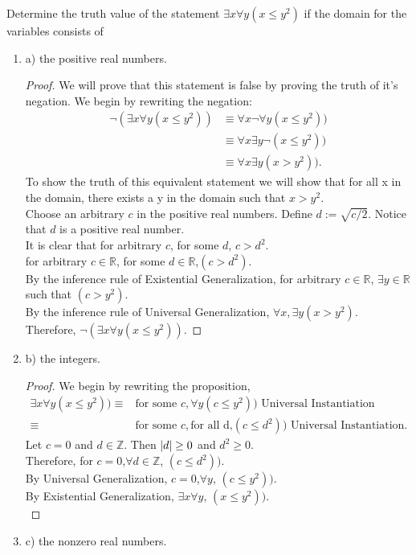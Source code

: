 \begin{exmp}
Determine the truth value of the statement $\exists x \forall y (x\leq y^2)$
if the domain for the variables consists of
\newline
\begin{enumerate}
\item a) the positive real numbers.
\vspace{3cm}
\begin{proof}
We will prove that this statement is false by proving the truth of it's negation.
We begin by rewriting the negation:
\begin{align}
\lnot(\exists x \forall y (x\leq y^2))&\equiv \forall x \lnot \forall y (x\leq y^2))\\
&\equiv \forall x  \exists y \lnot  (x\leq y^2))\\
&\equiv \forall x  \exists y (x > y^2)).
\end{align}
To show the truth of this equivalent statement we will show that for all x in the domain, there exists a y in the domain such that $x>y^2$.
\\
Choose an arbitrary $c$ in the positive real numbers. Define $d:=\sqrt{c/2}$. Notice that $d$ is a positive real number.
\\
It is clear that for arbitrary $c$, for some $d$, $c>d^2$.\\
 for arbitrary $c\in \mathbb{R}$, for some $d\in \mathbb{R}$,$(c > d^2) $.\\
By the inference rule of Existential Generalization,
for arbitrary $c\in \mathbb{R}$, $\exists y \in \mathbb{R}$ such that $(c > y^2) $.\\
By the inference rule of Universal Generalization,
$\forall x, \exists y (x > y^2)$.\\
Therefore, $\lnot(\exists x \forall y (x\leq y^2))$.
\end{proof}
\newpage 
\item b) the integers.
\vspace{3cm}
\begin{proof}
We begin by rewriting the proposition,
\begin{align}
\exists x \forall y (x\leq y^2))\equiv& \text{for some } c,\forall y (c\leq y^2))\text{ Universal Instantiation}\\
\equiv& \text{for some } c,\text{for all d,} (c\leq d^2))\text{ Universal Instantiation}.
\end{align}
Let $c=0$ and $d\in \mathbb{Z}$. Then $\left\lvert d\right\rvert\geq 0$ and $d^2\geq 0$.\\
Therefore, for $c=0$,$\forall d\in \mathbb{Z}$, $ (c\leq d^2))$.\\
By Universal Generalization, $c=0$,$\forall y$, $ (c\leq y^2))$.\\
By Existential Generalization, $\exists x$$\forall y$, $ (x\leq y^2))$.\\

\end{proof}
\noindent
\item c) the nonzero real numbers.
\vspace{3cm}
\newline
\end{enumerate}
\end{exmp}
